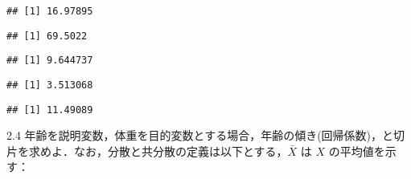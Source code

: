 \documentclass[11pt,]{problemset}
\newenvironment{Shaded}{\begin{snugshade}}{\end{snugshade}}
\newcommand{\CommentTok}[1]{\textcolor[rgb]{0.56,0.35,0.01}{\textit{#1}}}
\newcommand{\KeywordTok}[1]{\textcolor[rgb]{0.13,0.29,0.53}{\textbf{#1}}}
\newcommand{\NormalTok}[1]{#1}
\newcommand{\OperatorTok}[1]{\textcolor[rgb]{0.81,0.36,0.00}{\textbf{#1}}}
\begin{document}
\begin{verbatim}
## [1] 16.97895
\end{verbatim}

\begin{Shaded}
\end{Shaded}

\begin{verbatim}
## [1] 69.5022
\end{verbatim}

\begin{Shaded}
\end{Shaded}

\begin{verbatim}
## [1] 9.644737
\end{verbatim}

\begin{Shaded}
\end{Shaded}

\begin{verbatim}
## [1] 3.513068
\end{verbatim}

\begin{Shaded}
\end{Shaded}

\begin{verbatim}
## [1] 11.49089
\end{verbatim}

\newpage

2.4
年齢を説明変数，体重を目的変数とする場合，年齢の傾き(回帰係数)，と切片を求めよ．なお，分散と共分散の定義は以下とする，\(\bar{X}\)
は \(X\) の平均値を示す：
\end{document}
